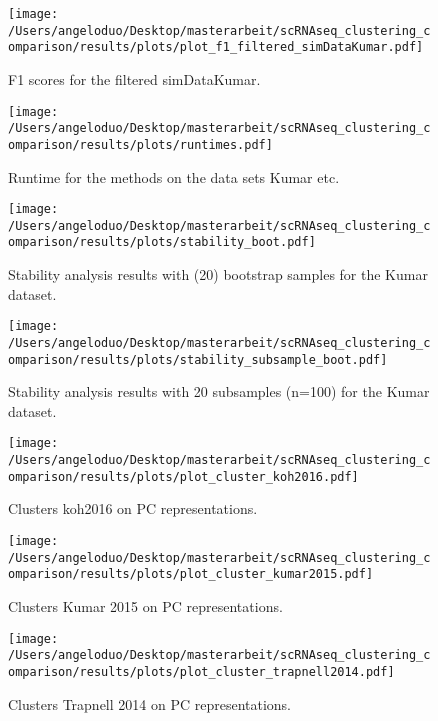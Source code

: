 \documentclass[11pt, a4paper]{article}\usepackage[]{graphicx}\usepackage[]{color}
\begin{document}
\begin{figure}[!h]
\texttt{[image: /Users/angeloduo/Desktop/masterarbeit/scRNAseq\_clustering\_comparison/results/plots/plot\_f1\_filtered\_simDataKumar.pdf]}
\caption{F1 scores for the filtered simDataKumar. }
\label{fig:f1sim}
\end{figure}


\begin{figure}[!h]
\texttt{[image: /Users/angeloduo/Desktop/masterarbeit/scRNAseq\_clustering\_comparison/results/plots/runtimes.pdf]}
\caption{Runtime for the methods on the data sets Kumar etc. }
\label{fig:runtime}
\end{figure}

\begin{figure}[!h]
\texttt{[image: /Users/angeloduo/Desktop/masterarbeit/scRNAseq\_clustering\_comparison/results/plots/stability\_boot.pdf]}
\caption{Stability analysis results with (20) bootstrap samples for the Kumar dataset.}
\label{fig:boot}
\end{figure}

\begin{figure}[!h]
\texttt{[image: /Users/angeloduo/Desktop/masterarbeit/scRNAseq\_clustering\_comparison/results/plots/stability\_subsample\_boot.pdf]}
\caption{Stability analysis results with 20 subsamples (n=100) for the Kumar dataset.}
\label{fig:stab}
\end{figure}

\begin{figure}[!h]
\texttt{[image: /Users/angeloduo/Desktop/masterarbeit/scRNAseq\_clustering\_comparison/results/plots/plot\_cluster\_koh2016.pdf]}
\caption{Clusters koh2016 on PC representations. }
\label{fig:clusterkoh}
\end{figure}


\begin{figure}[!h]
\texttt{[image: /Users/angeloduo/Desktop/masterarbeit/scRNAseq\_clustering\_comparison/results/plots/plot\_cluster\_kumar2015.pdf]}
\caption{Clusters Kumar 2015 on PC representations. }
\label{fig:clusterkumar}
\end{figure}

\begin{figure}[!h]
\texttt{[image: /Users/angeloduo/Desktop/masterarbeit/scRNAseq\_clustering\_comparison/results/plots/plot\_cluster\_trapnell2014.pdf]}
\caption{Clusters Trapnell 2014 on PC representations. }
\label{fig:clustertrapnell}
\end{figure}
\end{document}
